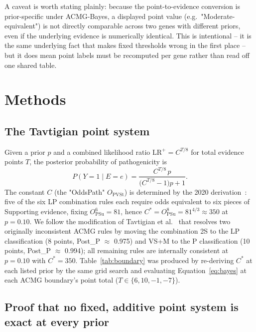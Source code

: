 \documentclass[11pt]{article}
\newcommand{\postp}{P(Y{=}1\mid E{=}e)}
\newcommand{\lrp}{\mathrm{LR}^{+}}
\begin{document}
A caveat is worth stating plainly: because the point-to-evidence conversion
is prior-specific under ACMG-Bayes, a displayed point value (e.g.\
"Moderate-equivalent") is not directly comparable across two genes with
different priors, even if the underlying evidence is numerically identical.
This is intentional -- it is the same underlying fact that makes fixed
thresholds wrong in the first place -- but it does mean point labels must be
recomputed per gene rather than read off one shared table.

\section*{Methods}

\subsection*{The Tavtigian point system}

Given a prior $p$ and a combined likelihood ratio $\lrp = C^{T/8}$ for total
evidence points $T$, the posterior probability of pathogenicity is
\begin{equation}
  \postp =
  \frac{C^{T/8}\, p}{\bigl(C^{T/8} - 1\bigr)p + 1}.
  \label{eq:bayes}
\end{equation}
The constant $C$ (the "OddsPath" $O_{\mathrm{PVSt}}$) is determined by the
2020 derivation~\cite{Tavtigian2020}: five of the six LP combination rules
each require odds equivalent to six pieces of Supporting evidence, fixing
$O_{\mathrm{PSu}}^6 = 81$, hence
$C^* = O_{\mathrm{PSu}}^8 = 81^{4/3} \approx 350$ at $p = 0.10$. We follow
the modification of Tavtigian et al.~\cite{tavtigian2018modeling} that
resolves two originally inconsistent ACMG rules by moving the combination 2S
to the LP classification (8 points, Post\_P $\approx$ 0.975) and VS+M to the
P classification (10 points, Post\_P $\approx$ 0.994); all remaining rules
are internally consistent at $p=0.10$ with $C^*=350$. Table~\ref{tab:boundary}
was produced by re-deriving $C^*$ at each listed prior by the same grid
search and evaluating Equation~\ref{eq:bayes} at each ACMG boundary's point
total ($T\in\{6,10,-1,-7\}$).

\subsection*{Proof that no fixed, additive point system is exact at every prior}
\end{document}

